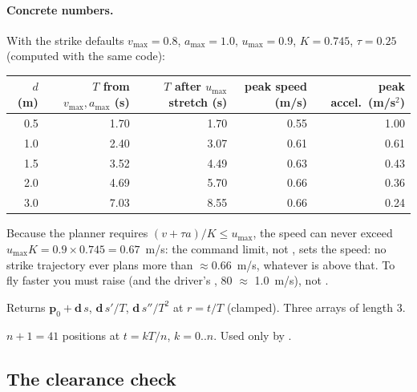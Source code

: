 \paragraph{Concrete numbers.} With the strike defaults $v_{\max}=0.8$, $a_{\max}=1.0$, $u_{\max}=0.9$,
$K=0.745$, $\tau = 0.25$ (computed with the same code):

\begin{center}
\begin{tabular}{@{}rrrrr@{}}
\toprule
$d$ (m) & $T$ from $v_{\max}, a_{\max}$ (s) & $T$ after $u_{\max}$ stretch (s) & peak speed (m/s) & peak accel.\ (m/s$^2$) \\
\midrule
0.5 & 1.70 & 1.70 & 0.55 & 1.00 \\
1.0 & 2.40 & 3.07 & 0.61 & 0.61 \\
1.5 & 3.52 & 4.49 & 0.63 & 0.43 \\
2.0 & 4.69 & 5.70 & 0.66 & 0.36 \\
3.0 & 7.03 & 8.55 & 0.66 & 0.24 \\
\bottomrule
\end{tabular}
\end{center}

\begin{keypoint}
Because the planner requires $(v + \tau a)/K \le u_{\max}$, the speed can never exceed
$u_{\max} K = 0.9 \times 0.745 = 0.67$~m/s: the command limit, not , sets the
speed: no strike trajectory ever plans more than $\approx 0.66$~m/s, whatever  is above that. To fly
faster you must raise  (and the driver's , 80 $\approx$ 1.0~m/s), not .
\end{keypoint}

Returns $\mathbf p_0 + \mathbf d\,s$, $\mathbf d\,s'/T$, $\mathbf d\,s''/T^2$ at $r = t/T$ (clamped). Three
 arrays of length 3.

$n+1 = 41$ positions at $t = kT/n$, $k = 0..n$. Used only by .

\subsection{The clearance check}

